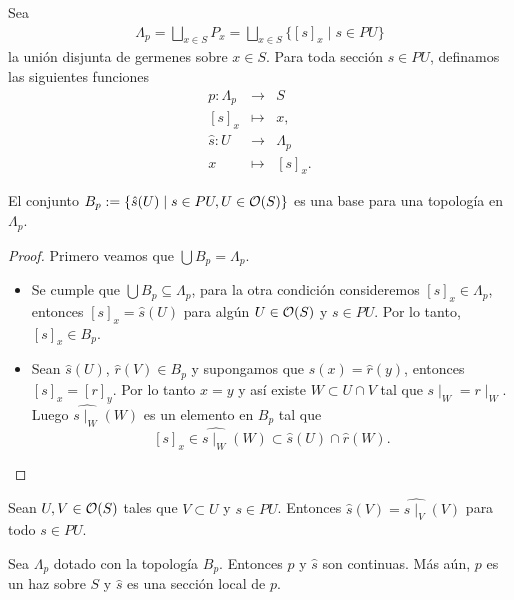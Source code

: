 Sea 
\begin{eqnarray*}
\Lambda_p=\bigsqcup_{x\in S}P_x=\bigsqcup_{x\in S}\{[s]_x\mid s\in PU\}
\end{eqnarray*} 
la unión disjunta de germenes sobre $x\in S$. Para toda sección $s\in PU$, definamos las siguientes funciones
\begin{eqnarray*}
    p:\Lambda_p&\to& S\\
    \left[s\right]_x&\mapsto& x,\\
    \hat{s}:U&\to&\Lambda_p\\
    x&\mapsto& \left[s\right]_x.
\end{eqnarray*}
\begin{lema}
    El conjunto $B_p:=\{\hat{s}(U)\mid s\in PU, U\in{\mathcal O}(S)\}$ es una base para una topología en $\Lambda_p$.
\end{lema}

\begin{proof}
    Primero veamos que $\bigcup B_p=\Lambda_p$.
    \begin{itemize}
        \item Se cumple que $\bigcup B_p\subseteq \Lambda_p$, para la otra condición consideremos $[s]_x\in \Lambda_p$, entonces $[s]_x=\hat{s}(U)$ para algún $U\in{\mathcal O}(S)$ y $s\in PU$. Por lo tanto, $[s]_x\in B_p$.
        \item Sean $\hat{s}(U)$, $\hat{r}(V)\in B_p$ y supongamos que $\hat{s}(x)=\hat{r}(y)$, entonces $[s]_x=[r]_y$. Por lo tanto $x=y$ y así existe $W\subset U\cap V$ tal que $s\mid_W=r\mid_W$. Luego $\widehat{s\mid_W}(W)$ es un elemento en $B_p$ tal que
        \[
        [s]_x\in\widehat{s\mid_W}(W)\subset \hat{s}(U)\cap \hat{r}(W).        
        \]
    \end{itemize}
\end{proof}

\begin{obs}
Sean $U,V\in {\mathcal O}(S)$ tales que $V\subset U$ y $s\in PU$. Entonces $\hat{s}(V)=\widehat{s\mid_V}(V)$ para todo $s\in PU$.
\end{obs}

\begin{lema}
Sea $\Lambda_p$ dotado con la topología $B_p$. Entonces $p$ y $\hat{s}$ son continuas. Más aún, $p$ es un haz sobre $S$ y $\hat{s}$ es una sección local de $p$.
\end{lema}

